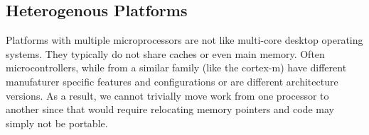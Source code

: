 \subsection{Heterogenous Platforms}

Platforms with multiple microprocessors are not like multi-core desktop
operating systems. They typically do not share caches or even main memory.
Often microcontrollers, while from a similar family (like the cortex-m) have
different manufaturer specific features and configurations or are different
architecture versions. As a result, we cannot trivially move work from one
processor to another since that would require relocating memory pointers and
code may simply not be portable.
